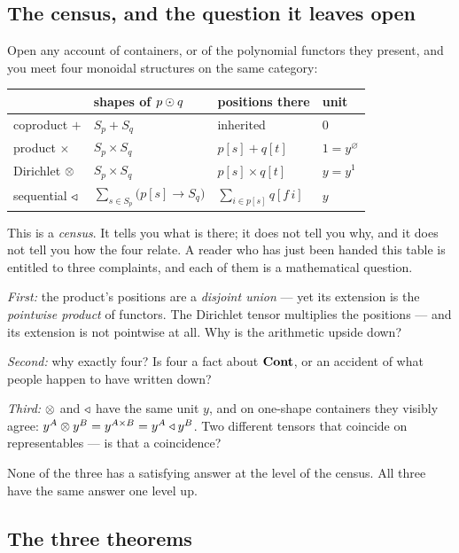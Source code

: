 \subsection*{The census, and the question it leaves open}

Open any account of containers, or of the polynomial functors they present, and
you meet four monoidal structures on the same category:

\begin{center}
\begin{tabular}{@{}llll@{}}
\toprule
 & shapes of $p\mathbin{\odot} q$ & positions there & unit \\
\midrule
coproduct $+$   & $S_p + S_q$ & inherited & $0$ \\
product $\times$ & $S_p\times S_q$ & $p[s] + q[t]$ & $1=y^{\varnothing}$ \\
Dirichlet $\mathbin{\otimes}$ & $S_p\times S_q$ & $p[s]\times q[t]$ & $y=y^{1}$ \\
sequential $\mathbin{\triangleleft}$ & $\sum_{s\in S_p}\bigl(p[s]\to S_q\bigr)$ &
   $\sum_{i\in p[s]} q[f\,i]$ & $y$ \\
\bottomrule
\end{tabular}
\end{center}

This is a \emph{census}. It tells you what is there; it does not tell you why,
and it does not tell you how the four relate. A reader who has just been handed
this table is entitled to three complaints, and each of them is a mathematical
question.

\emph{First:} the product's positions are a \emph{disjoint union} --- yet its
extension is the \emph{pointwise product} of functors. The Dirichlet tensor
multiplies the positions --- and its extension is not pointwise at all. Why is
the arithmetic upside down?

\emph{Second:} why exactly four? Is four a fact about $\mathbf{Cont}$, or an accident of
what people happen to have written down?

\emph{Third:} $\mathbin{\otimes}$ and $\mathbin{\triangleleft}$ have the same unit $y$, and on one-shape
containers they visibly agree: $y^A\mathbin{\otimes} y^B = y^{A\times B} = y^A\mathbin{\triangleleft} y^B$. Two
different tensors that coincide on representables --- is that a coincidence?

None of the three has a satisfying answer at the level of the census. All three
have the same answer one level up.

\subsection*{The three theorems}

